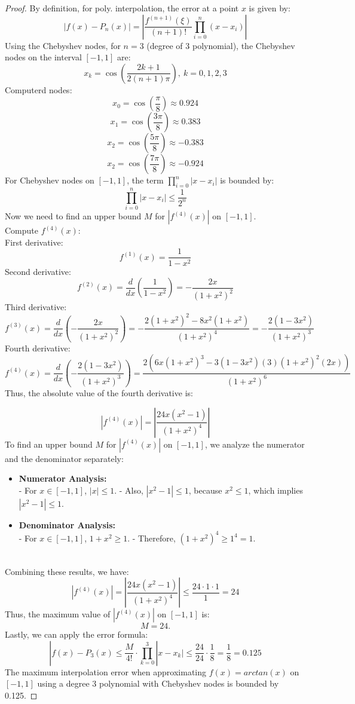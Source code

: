 \documentclass{article}
\begin{document}
\begin{proof}
    By definition, for poly. interpolation, the error at a point $x$ is given by: 
    \[ \left| f(x) - P_n(x) \right| = \left| \frac{f^{(n+1)}(\xi)}{(n+1)!} \prod_{i=0}^{n} (x - x_i) \right| \]
    Using the Chebyshev nodes, for $n = 3$ (degree of 3 polynomial), the Chebyshev nodes on the interval $[-1,1]$ are:
    \[ x_k = \cos \left( \frac{2k + 1}{2(n + 1) \pi} \right), \ k = 0,1,2,3 \] 
    Computerd nodes:
    \[ x_0 = \cos(\frac{\pi}{8}) \approx 0.924 \]
    \[ x_1 = \cos(\frac{3\pi}{8}) \approx 0.383 \]
    \[ x_2 = \cos(\frac{5\pi}{8}) \approx -0.383 \]
    \[ x_2 = \cos(\frac{7\pi}{8}) \approx -0.924 \]
    For Chebyshev nodes on $[-1, 1]$, the term $\prod_{i=0}^{n} |x - x_i|$ is bounded by:
    \[ \prod_{i = 0}^{n} |x - x_i| \leq \frac{1}{2^n} \]
    Now we need to find an upper bound $M$ for $|f^{(4)}(x)|$ on $[-1, 1]$.
    \\
    Compute $f^{(4)}(x)$:
    \\
    First derivative:
    \[ f^{(1)}(x) = \frac{1}{1 - x^2} \]
    Second derivative:
    \[ f^{(2)}(x) = \frac{d}{dx} (\frac{1}{1 - x^2}) = - \frac{2x}{(1 + x^2)^2} \]
    Third derivative:
    \[ f^{(3)}(x) = \frac{d}{dx} (- \frac{2x}{(1 + x^2)^2}) = -\frac{2(1 + x^2)^2 - 8x^2(1 + x^2)}{(1 + x^2)^4} = -\frac{2(1 - 3x^2)}{(1 + x^2)^3} \]
    Fourth derivative:
    \[ f^{(4)}(x) = \frac{d}{dx} (-\frac{2(1 - 3x^2)}{(1 + x^2)^3}) = \frac{2(6x(1+x^2)^3 - 3(1-3x^2)(3)(1 + x^2)^2(2x))}{(1 + x^2)^6} \]
    Thus, the absolute value of the fourth derivative is:

    \[
        |f^{(4)}(x)| = \left| \frac{24x(x^2 - 1)}{(1 + x^2)^4} \right|
    \]
    To find an upper bound \( M \) for \( |f^{(4)}(x)| \) on \([-1, 1]\), we analyze the numerator and the denominator separately:

    \begin{itemize}
        \item \textbf{Numerator Analysis:} 
        \\
        - For \( x \in [-1, 1] \), \( |x| \leq 1 \). 
        - Also, \( |x^2 - 1| \leq 1 \), because \( x^2 \leq 1 \), which implies \( |x^2 - 1| \leq 1 \).

        \item \textbf{Denominator Analysis:} 
        \\
        - For \( x \in [-1, 1] \), \( 1 + x^2 \geq 1 \).
        - Therefore, \( (1 + x^2)^4 \geq 1^4 = 1 \).
    \end{itemize}
    \\
    Combining these results, we have:
    \[
        |f^{(4)}(x)| = \left| \frac{24x(x^2 - 1)}{(1 + x^2)^4} \right| \leq \frac{24 \cdot 1 \cdot 1}{1} = 24
    \]
    Thus, the maximum value of \( |f^{(4)}(x)| \) on \( [-1, 1] \) is:
    \[
        M = 24.
    \]
    Lastly, we can apply the error formula:
    \[ |f(x) - P_3(x) \leq \frac{M}{4!} \cdot \prod_{k=0}^{3}|x - x_k| \leq \frac{24}{24} \cdot \frac{1}{8} = \frac{1}{8} = 0.125 \]
    The maximum interpolation error when approximating $f(x) = arctan(x)$ on $[-1,1]$ using a degree 3 polynomial with Chebyshev nodes is bounded by 0.125.
\end{proof}
\end{document}
